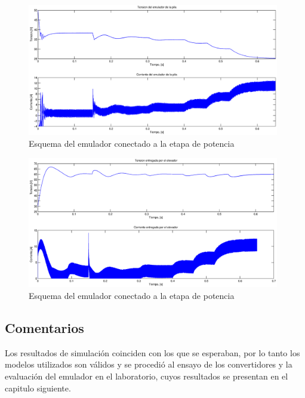 \begin{figure}[H]
 \centering
 \includegraphics[width=11cm]{gfx/curvas_emulador_acoplado.eps}
 \caption{Esquema del emulador conectado a la etapa de potencia}
 \label{fig:curvas_emulador_acoplado}
\end{figure}

\begin{figure}[H]
 \centering
 \includegraphics[width=11cm]{gfx/curvas_elevador_acoplado.eps}
 \caption{Esquema del emulador conectado a la etapa de potencia}
 \label{fig:curvas_elevador_acoplado}
\end{figure}


\subsection{Comentarios}
Los resultados de simulación coinciden con los que se esperaban, por lo tanto los modelos utilizados son válidos y se procedió al ensayo
de los convertidores y la evaluación del emulador en el laboratorio, cuyos resultados se presentan en el capitulo siguiente.
